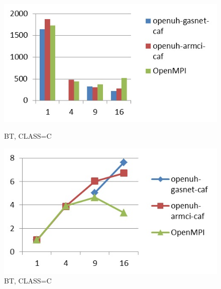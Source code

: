 \begin{figure}[ht]
\begin{minipage}[b]{0.45\linewidth}
\centering
\includegraphics[width=\textwidth]{./figures/bt_C_time.jpg}
\caption{BT, CLASS=C}
\label{fig:figure1}
\end{minipage}
\hspace{0.5cm}
\begin{minipage}[b]{0.45\linewidth}
\centering
\includegraphics[width=\textwidth]{./figures/bt_C_scalability.jpg}
\caption{BT, CLASS=C}
\label{fig:figure2}
\end{minipage}
\end{figure}



